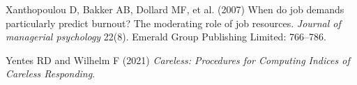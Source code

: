 \documentclass[
  man]{apa7}
\newlength{\cslhangindent}
\newlength{\cslentryspacingunit} %
\newenvironment{CSLReferences}[2] %
 {%
  \setlength{\parindent}{0pt}
  \ifodd #1
  \let\oldpar\par
  \def\par{\hangindent=\cslhangindent\oldpar}
  \fi
  \setlength{\parskip}{#2\cslentryspacingunit}
 }%
 {}
\begin{document}
\begin{CSLReferences}{1}{0}
\leavevmode{}%
Xanthopoulou D, Bakker AB, Dollard MF, et al. (2007) When do job demands particularly predict burnout? The moderating role of job resources. \emph{Journal of managerial psychology} 22(8). Emerald Group Publishing Limited: 766--786.

\leavevmode{}%
Yentes RD and Wilhelm F (2021) \emph{Careless: Procedures for Computing Indices of Careless Responding}.

\end{CSLReferences}

\endgroup
\end{document}
